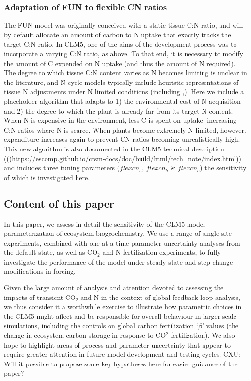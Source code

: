 \documentclass[draft,linenumbers]{agujournal}
\begin{document}
\subsubsection{Adaptation of FUN to flexible CN ratios}
The FUN model was originally conceived with a static tissue C:N ratio, and will by default allocate an amount of carbon to N uptake that exactly tracks the target C:N ratio. In CLM5, one of the aims of the development process was to incorporate a varying C:N ratio, as above. To that end, it is necessary to modify the amount of C expended on N uptake (and thus the amount of N required). The degree to which tissue C:N content varies as N becomes limiting is unclear in the literature, and N cycle models typically include heuristic representations of tissue N adjustments under N limited conditions (including \cite{zaehle2010},\cite{ghimire2016}). Here we include a placeholder algorithm that adapts to 1) the environmental cost of N acquisition and 2) the degree to which the plant is already far from its target N content. When N is expensive in the environment, less C is spent on uptake, increasing C:N ratios where N is scarce. When plants become extremely N limited, however, expenditure increases again to prevent CN ratios becoming unrealistically high. This new algorithm is also documented in the CLM5 technical description ((\url{(https://escomp.github.io/ctsm-docs/doc/build/html/tech_note/index.html)}) and includes three tuning parameters ($flexcn_{a}$, $flexcn_{b}$ \& $flexcn_{c}$) the sensitivity of which is investigated here.

\subsection{Content of this paper}
In this paper, we assess in detail the sensitivity of the CLM5 model parameterization of ecosystem biogeochemistry. We use a range of single site experiments, combined with one-at-a-time parameter uncertainty analyses from the default state, as well as CO$_{2}$ and N fertilization experiments, to fully investigate the performance of the model under steady-state and step-change modifications in forcing.

Given the large amount of analysis and attention devoted to assessing the impacts of transient CO$_{2}$ and N in the context of global feedback loop analysis, we thus consider it a worthwhile exercise to illustrate how parametric choices in the CLM5 might affect and be responsible for overall behaviour in larger-scale simulations, including the controls on global carbon fertilization `$\beta$' values  (the change in ecosystem carbon storage in response to CO$^{2}$ fertilization). We also hope to highlight areas of process and parameter uncertainty that appear to require greater attention in future model development and testing cycles. {CXU: Will it possible to propose some key hypotheses here for easier guidance of the paper?}
\end{document}

